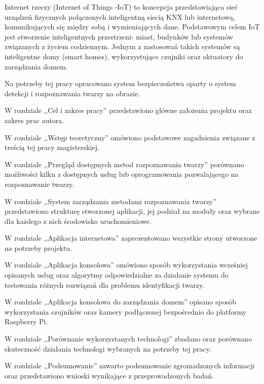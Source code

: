 Internet rzeczy (Internet of Things -IoT) to koncepcja przedstawiająca sieć urządzeń fizycznych połączonych inteligentną siecią KNX lub internetową, komunikujących się między sobą i wymieniających dane. Podstawowym celem IoT jest stworzenie inteligentnych przestrzeni- miast, budynków lub systemów związanych z życiem codziennym. Jednym z zastosowań takich systemów są inteligentne domy (smart homes), wykorzystujące czujniki oraz aktuatory do zarządzania domem.

Na potrzeby tej pracy opracowano system bezpieczeństwa oparty o system detekcji i rozpoznawania twarzy na obrazie.


W rozdziale ,,Cel i zakres pracy'' przedstawiono główne założenia projektu oraz zakres prac autora.

W rozdziale ,,Wstęp teoretyczny'' omówiono podstawowe zagadnienia związane z treścią tej pracy magisterskiej.

W rozdziale ,,Przegląd dostępnych metod rozpoznawania twarzy'' porównano możliwości kilku z dostępnych usług lub oprogramowania pozwalającego na rozpoznawanie twarzy.

W rozdziale ,,System zarządzania metodami rozpoznawania twarzy'' przedstawiono strukturę stworzonej aplikacji, jej podział na moduły oraz wybrane dla każdego z nich środowisko uruchomieniowe.

W rozdziale ,,Aplikacja internetowa'' zaprezentowano wszystkie strony utworzone na potrzeby projektu.

W rozdziale ,,Aplikacja konsolowa'' omówiono sposób wykorzystania wcześniej opisanych usług oraz algorytmy odpowiedzialne za działanie systemu do testowania różnych rozwiązań dla problemu identyfikacji twarzy.

W rozdziale ,,Aplikacja konsolowa do zarządzania domem'' opisano sposób wykorzystania czujników oraz kamery podłączonej bezpośrednio do platformy Raspberry Pi.

W rozdziale ,,Porównanie wykorzystanych technologi'' zbadano oraz porównano skuteczność działania technologi wybranych na potrzeby tej pracy.

W rozdziale ,,Podsumowanie'' zawarto podsumowanie zgromadzonych informacji oraz przedstawiono wnioski wynikające z przeprowadzonych badań.



